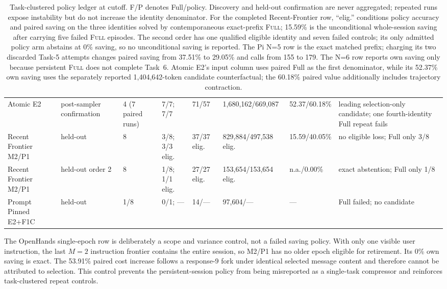 \documentclass[11pt]{article}
\begin{document}
\begin{table}[H]
\begin{tabularx}{\linewidth}{p{.145\linewidth}p{.095\linewidth}p{.08\linewidth}p{.10\linewidth}p{.09\linewidth}p{.15\linewidth}p{.115\linewidth}Y}
Atomic E2 & post-sampler confirmation & 4 (7 paired runs) & 7/7; 7/7 & 71/57 & 1,680,162/669,087 & 52.37/60.18\% & leading selection-only candidate; one fourth-identity Full repeat fails \\
Recent Frontier M2/P1 & held-out & 8 & 3/8; 3/3 elig. & 37/37 elig. & 829,884/497,538 elig. & 15.59/40.05\% & no eligible loss; Full only 3/8 \\
Recent Frontier M2/P1 & held-out order 2 & 8 & 1/8; 1/1 elig. & 27/27 elig. & 153,654/153,654 elig. & n.a./0.00\% & exact abstention; Full only 1/8 \\
Prompt Pinned E2+F1C & held-out & 1/8 & 0/1; --- & 14/--- & 97,604/--- & --- & Full failed; no candidate \\
\bottomrule
\end{tabularx}
\caption{Task-clustered policy ledger at cutoff.  F/P denotes Full/policy.
Discovery and held-out confirmation are never aggregated; repeated runs expose
instability but do not increase the identity denominator.  For the completed
Recent-Frontier row, ``elig.'' conditions policy accuracy and paired saving on
the three identities solved by contemporaneous exact-prefix \textsc{Full};
15.59\% is the unconditional whole-session saving after carrying five failed
\textsc{Full} episodes.  The second order has one qualified eligible identity
and seven failed controls; its only admitted policy arm abstains at 0\% saving,
so no unconditional saving is reported.  The Pi N=5 row is the exact matched
prefix; charging its two discarded Task-5 attempts changes paired saving from
37.51\% to 29.05\% and calls from 155 to 179.  The N=6 row reports own saving
only because persistent \textsc{Full} does not complete Task~6.  Atomic E2's
input column uses paired Full as the first denominator, while its 52.37\% own
saving uses the separately reported 1,404,642-token candidate counterfactual;
the 60.18\% paired value additionally includes trajectory contraction.}
\label{tab:editorial-headline-policies}
\end{table}

The OpenHands single-epoch row is deliberately a scope and variance control,
not a failed saving policy.  With only one visible user instruction, the last
$M=2$ instruction frontier contains the entire session, so M2/P1 has no older
epoch eligible for retirement.  Its 0\% own saving is exact.  The 53.91\%
paired cost increase follows a response-9 fork under identical selected
message content and therefore cannot be attributed to selection.  This
control prevents the persistent-session policy from being misreported as a
single-task compressor and reinforces task-clustered repeat controls.
\end{document}

